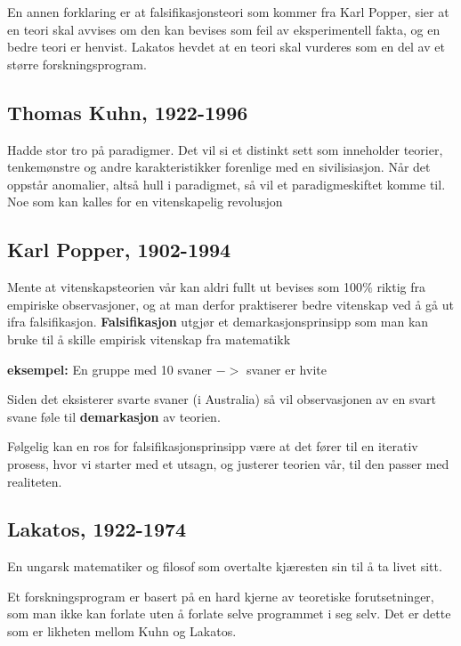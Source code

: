 \documentclass[11pt]{article}
\begin{document}
\vspace{1em}
En annen forklaring er at falsifikasjonsteori som kommer fra Karl Popper, sier at en teori skal avvises om den kan bevises som feil av eksperimentell fakta, og en bedre teori er henvist. Lakatos hevdet at en teori skal vurderes som en del av et større forskningsprogram.



\subsection{Thomas Kuhn, 1922-1996}
Hadde stor tro på paradigmer. Det vil si et distinkt sett som inneholder teorier, tenkemønstre og andre karakteristikker forenlige med en sivilisiasjon. Når det oppstår anomalier, altså hull i paradigmet, så vil et paradigmeskiftet komme til. Noe som kan kalles for en vitenskapelig revolusjon


\subsection{Karl Popper, 1902-1994}
Mente at vitenskapsteorien vår kan aldri fullt ut bevises som 100$\%$ riktig fra empiriske observasjoner, og at man derfor praktiserer bedre vitenskap ved å gå ut ifra falsifikasjon. \textbf{Falsifikasjon} utgjør et demarkasjonsprinsipp som man kan bruke til å skille empirisk vitenskap fra matematikk


\textbf{eksempel:}
\vspace{1em}
En gruppe med 10 svaner $->$ svaner er hvite

Siden det eksisterer svarte svaner (i Australia) så vil observasjonen av en svart svane føle til \textbf{demarkasjon} av teorien. 

\vspace{1em}
Følgelig kan en ros for falsifikasjonsprinsipp være at det fører til en iterativ prosess, hvor vi starter med et utsagn, og justerer teorien vår, til den passer med realiteten.  

\subsection{Lakatos, 1922-1974}

En ungarsk matematiker og filosof som overtalte kjæresten sin til å ta livet sitt. 

\vspace{1em}
Et forskningsprogram er basert på en hard kjerne av teoretiske forutsetninger, som man ikke kan forlate uten å forlate selve programmet i seg selv. Det er dette som er likheten mellom Kuhn og Lakatos. 
\end{document}
